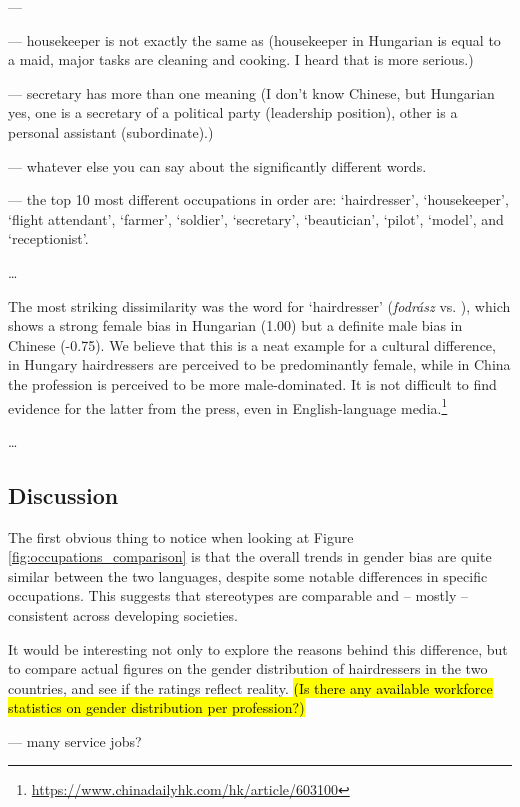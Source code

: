 \documentclass[11pt]{article}
\newcommand{\zh}[1]{\simplifiedchinesefont{#1}\rmfamily}
\begin{document}
---

--- housekeeper is not exactly the same as \zh{家政员} (housekeeper in Hungarian is equal to a maid, major tasks are cleaning and cooking. I heard that \zh{家政员} is more serious.)

--- secretary has more than one meaning (I don't know Chinese, but Hungarian yes, one is a secretary of a political party (leadership position), other is a personal assistant (subordinate).)

--- whatever else you can say about the significantly different words.

--- the top 10 most different occupations in order are: `hairdresser', `housekeeper', `flight attendant', `farmer', `soldier', `secretary', `beautician', `pilot', `model', and `receptionist'.

\dots

The most striking dissimilarity was the word for `hairdresser' (\textit{fodrász} vs. \zh{理发师}), which shows a strong female bias in Hungarian (1.00) but a definite male bias in Chinese (-0.75). We believe that this is a neat example for a cultural difference, in Hungary hairdressers are perceived to be predominantly female, while in China the profession is perceived to be more male-dominated. It is not difficult to find evidence for the latter from the press, even in English-language media.\footnote{\href{https://www.chinadailyhk.com/hk/article/603100}{https://www.chinadailyhk.com/hk/article/603100}}

\dots

\subsection{Discussion}\label{sec:discussion}

The first obvious thing to notice when looking at Figure \ref{fig:occupations_comparison} is that the overall trends in gender bias are quite similar between the two languages, despite some notable differences in specific occupations. This suggests that stereotypes are comparable and -- mostly -- consistent across developing societies.

It would be interesting not only to explore the reasons behind this difference, but to compare actual figures on the gender distribution of hairdressers in the two countries, and see if the ratings reflect reality. \hl{(Is there any available workforce statistics on gender distribution per profession?)}

--- many service jobs?
\end{document}
